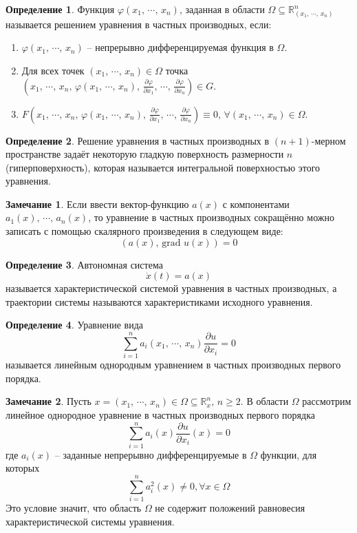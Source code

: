 \documentclass[a4paper,12pt]{article}
\renewcommand{\phi}{\ensuremath{\varphi}}
\renewcommand{\geq}{\ensuremath{\geqslant}}
\theoremstyle{plain}
\theoremstyle{definition}
\newtheorem{definition}{Определение}[section]
\newtheorem*{note}{Замечание}
\theoremstyle{remark}
\begin{document}
\begin{definition}
	Функция $\phi(x_1,\,\cdots,\,x_n)$, заданная  в области $\Omega \subseteq \mathbb{R}^n_{(x_1,\,\cdots,\,x_n)}$ называется решением уравнения в частных производных, если:
	\begin{enumerate}
		\item $\phi(x_1,\,\cdots,\,x_n)$ -- непрерывно дифференцируемая функция в $\Omega$.
		\item Для всех точек $(x_1,\,\cdots,\,x_n) \in \Omega$ точка $(x_1,\,\cdots,\,x_n,\, \phi(x_1,\,\cdots,\,x_n),\, \frac{\partial \phi}{\partial x_1},\,\cdots,\,\frac{\partial \phi}{\partial x_n}) \in G$.
		\item $F(x_1,\,\cdots,\,x_n,\, \phi(x_1,\,\cdots,\,x_n),\, \frac{\partial \phi}{\partial x_1},\,\cdots,\,\frac{\partial \phi}{\partial x_n}) \equiv 0,\, \forall (x_1,\,\cdots,\,x_n) \in \Omega$.
	\end{enumerate}
\end{definition}

\begin{definition}
	Решение уравнения в частных производных в $(n + 1)$-мерном пространстве задаёт некоторую гладкую поверхность размерности $n$ (гиперповерхность), которая называется интегральной поверхностью этого уравнения.
\end{definition}

\begin{note}
	Если ввести вектор-функцию $a(x)$ с компонентами $a_1(x),\,\cdots,\,a_n(x)$, то уравнение в частных производных сокращённо можно записать с помощью скалярного произведения в следующем виде:
	\[(a(x),\, \text{grad }u(x)) = 0\]
\end{note}

\begin{definition}
	Автономная система
	\[\dot{x}(t) = a(x)\]
	называется характеристической системой уравнения в частных производных, а траектории системы называются характеристиками исходного уравнения.
\end{definition}

\begin{definition}
	Уравнение вида
	\[\sum_{i = 1}^na_i(x_1,\,\cdots,\,x_n)\frac{\partial u}{\partial x_i} = 0\]
	называется линейным однородным уравнением в частных производных первого порядка.
\end{definition}

\begin{note}
	Пусть $x = (x_1,\,\cdots,\,x_n) \in \Omega \subseteq \mathbb{R}^n_x,\, n \geq 2$. В области $\Omega$ рассмотрим линейное однородное уравнение в частных производных первого порядка
	\[\sum_{i = 1}^n a_i(x)\frac{\partial u}{\partial x_i}(x) = 0\]
	где $a_i(x)$ -- заданные непрерывно дифференцируемые в $\Omega$ функции, для которых
	\[\sum_{i = 1}^n a_i^2(x) \neq 0, \forall x \in \Omega\]
	Это условие значит, что область $\Omega$ не содержит положений равновесия характеристической системы уравнения.
\end{note}
\end{document}
